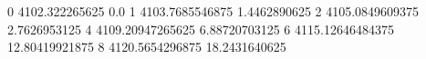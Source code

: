 0 4102.322265625 0.0
1 4103.7685546875 1.4462890625
2 4105.0849609375 2.7626953125
4 4109.20947265625 6.88720703125
6 4115.12646484375 12.80419921875
8 4120.5654296875 18.2431640625
